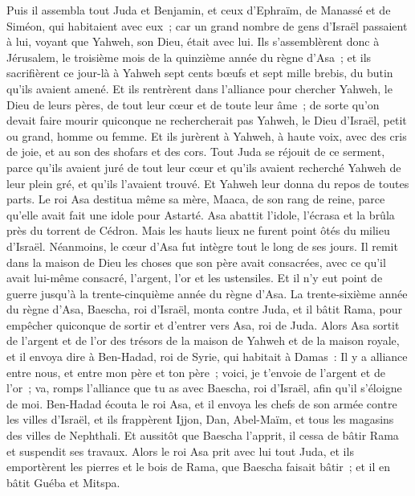 \begin{multicols}{2}
Puis il assembla tout Juda et Benjamin, et ceux d'Ephraïm, de Manassé et de Siméon, qui habitaient avec eux~; car un grand nombre de gens d'Israël passaient à lui, voyant que Yahweh, son Dieu, était avec lui.
Ils s'assemblèrent donc à Jérusalem, le troisième mois de la quinzième année du règne d'Asa~;
et ils sacrifièrent ce jour-là à Yahweh sept cents bœufs et sept mille brebis, du butin qu'ils avaient amené.
Et ils rentrèrent dans l'alliance pour chercher Yahweh, le Dieu de leurs pères, de tout leur cœur et de toute leur âme~;
de sorte qu'on devait faire mourir quiconque ne rechercherait pas Yahweh, le Dieu d'Israël, petit ou grand, homme ou femme.
Et ils jurèrent à Yahweh, à haute voix, avec des cris de joie, et au son des shofars et des cors.
Tout Juda se réjouit de ce serment, parce qu'ils avaient juré de tout leur cœur et qu'ils avaient recherché Yahweh de leur plein gré, et qu'ils l'avaient trouvé. Et Yahweh leur donna du repos de toutes parts.
Le roi Asa destitua même sa mère, Maaca, de son rang de reine, parce qu'elle avait fait une idole pour Astarté. Asa abattit l'idole, l'écrasa et la brûla près du torrent de Cédron.
Mais les hauts lieux ne furent point ôtés du milieu d'Israël. Néanmoins, le cœur d'Asa fut intègre tout le long de ses jours.
Il remit dans la maison de Dieu les choses que son père avait consacrées, avec ce qu'il avait lui-même consacré, l'argent, l'or et les ustensiles.
Et il n'y eut point de guerre jusqu'à la trente-cinquième année du règne d'Asa.
\VerseOne{}La trente-sixième année du règne d'Asa, Baescha, roi d'Israël, monta contre Juda, et il bâtit Rama, pour empêcher quiconque de sortir et d'entrer vers Asa, roi de Juda.
Alors Asa sortit de l'argent et de l'or des trésors de la maison de Yahweh et de la maison royale, et il envoya dire à Ben-Hadad, roi de Syrie, qui habitait à Damas~:
Il y a alliance entre nous, et entre mon père et ton père~; voici, je t'envoie de l'argent et de l'or~; va, romps l'alliance que tu as avec Baescha, roi d'Israël, afin qu'il s'éloigne de moi.
Ben-Hadad écouta le roi Asa, et il envoya les chefs de son armée contre les villes d'Israël, et ils frappèrent Ijjon, Dan, Abel-Maïm, et tous les magasins des villes de Nephthali.
Et aussitôt que Baescha l'apprit, il cessa de bâtir Rama et suspendit ses travaux.
Alors le roi Asa prit avec lui tout Juda, et ils emportèrent les pierres et le bois de Rama, que Baescha faisait bâtir~; et il en bâtit Guéba et Mitspa.

\end{multicols}
